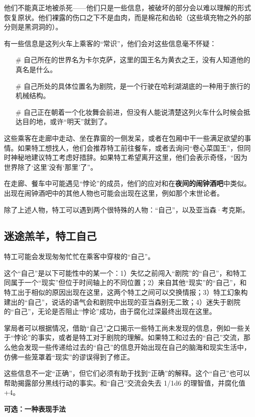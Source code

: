 他们不能真正地被杀死——他们只是一些信息，被破坏的部分会以难以理解的形式恢复原状。他们裸露的伤口之下不是血肉，而是棉花和齿轮（这些填充物之外的部分则是黑洞洞的）。

有一些信息是这列火车上乘客的“常识”，他们会对这些信息毫不怀疑：
\begin{itemize}
    \item[\#] 自己所在的世界名为卡尔克萨，这里的国王名为黄衣之王，没有人知道他的真名是什么。
    \item[\#] 自己所处的具体位置名为剧院，是一个行驶在哈利湖湖底的一种用于旅行的机械结构。
    \item[\#] 自己正在朝着一个化妆舞会前进，但没有人能说清楚这列火车什么时候会抵达目的地，或许“明天”就到了。
\end{itemize}

这些乘客在走廊中走动、坐在靠窗的一侧发呆，或者在包厢中干一些满足欲望的事情。如果特工想找人，他们会推荐特工前往餐车，或者去询问“卷心菜国王”，但同时神秘地建议特工考虑好措辞。如果特工希望离开这里，他们会表示奇怪，“因为世界除了‘这里’没有‘那里’了”。

在走廊、餐车中可能遇见“悖论”的成员，他们的应对和在\textbf{夜间的闹钟酒吧}中类似。出现在闹钟酒吧中的其他人物也可能会出现在这里，例如那个末世论者。

除了上述人物，特工可以遇到两个很特殊的人物：“自己”，以及亚当森·考克斯。

\subsection{迷途羔羊，特工自己}
特工可能会发现匆匆忙忙在乘客中穿梭的“自己”。

这个“自己”是以下可能性中的某一个：1）失忆之前闯入“剧院”的“自己”，和特工同属于一个“现实”但位于时间轴上的不同位置；2）来自其他“现实”的“自己”，和特工出于相似的原因出现在这里，这两个特工之间可以交换情报；3）特工幻象构建出的“自己”，说话的语气会和剧院中出现的亚当森别无二致；4）迷失于剧院的“自己”，无论是否阻止“悖论”成功，由于腐化过深最终出现在这里。

掌局者可以根据情况，借助“自己”之口揭示一些特工尚未发现的信息，例如一些关于“悖论”的事实，或者是特工对于剧院的理解。如果特工和过去的“自己”交流，那么他会发现一些传递给过去的“自己”的信息开始出现在自己的脑海和现实生活中，仿佛一些笼罩着“现实”的谬误得到了修正。

这些信息不一定“正确”，但它们必须有助于找到“正确”的解释。这个“自己”也可以帮助揭露部分黑线行动的事实。和“自己”交流会失去 1/1d6 的理智值，并腐化值+4。

\textbf{可选：一种表现手法}

